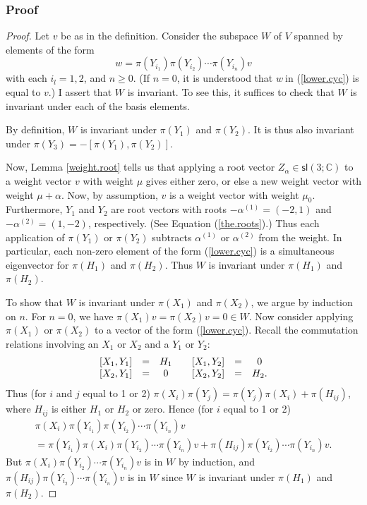 \documentclass{amsbook}
\theoremstyle{plain}
\numberwithin{equation}{chapter}
\numberwithin{theorem}{chapter}
\begin{document}
\subsubsection{Proof}

\begin{proof}
Let $v$ be as in the definition. Consider the subspace $W$ of $V$ spanned by
elements of the form
\begin{equation}
w=\pi(Y_{i_{1}})\pi(Y_{i_{2}})\cdots\pi(Y_{i_{n}})v\label{lower.cyc}%
\end{equation}
with each $i_{l}=1,2$, and $n\geq0$. (If $n=0$, it is understood that $w\ $in
(\ref{lower.cyc}) is equal to $v$.) I assert that $W$ is invariant. To see
this, it suffices to check that $W$ is invariant under each of the basis elements.

By definition, $W$ is invariant under $\pi(Y_{1})$ and $\pi(Y_{2})$. It is
thus also invariant under $\pi(Y_{3})=-\left[  \pi(Y_{1}),\pi(Y_{2})\right]  $.

Now, Lemma \ref{weight.root} tells us that applying a root vector $Z_{\alpha
}\in\mathsf{sl}\left(  3;\mathbb{C}\right)  $ to a weight vector $v$ with
weight $\mu$ gives either zero, or else a new weight vector with weight
$\mu+\alpha$. Now, by assumption, $v$ is a weight vector with weight $\mu_{0}%
$. Furthermore, $Y_{1}$ and $Y_{2}$ are root vectors with roots $-\alpha
^{(1)}=(-2,1)$ and $-\alpha^{(2)}=(1,-2)$, respectively. (See Equation
(\ref{the.roots}).) Thus each application of $\pi(Y_{1})$ or $\pi(Y_{2})$
subtracts $\alpha^{(1)}$ or $\alpha^{(2)}$ from the weight. In particular,
each non-zero element of the form (\ref{lower.cyc}) is a simultaneous
eigenvector for $\pi(H_{1})$ and $\pi(H_{2})$. Thus $W$ is invariant under
$\pi(H_{1})$ and $\pi(H_{2})$.

To show that $W$ is invariant under $\pi(X_{1})$ and $\pi(X_{2})$, we argue by
induction on $n$. For $n=0$, we have $\pi(X_{1})v=\pi(X_{2})v=0\in W$. Now
consider applying $\pi(X_{1})$ or $\pi(X_{2})$ to a vector of the form
(\ref{lower.cyc}). Recall the commutation relations involving an $X_{1}$ or
$X_{2}$ and a $Y_{1}$ or $Y_{2}$:
\[%
\begin{array}
[c]{ccccccc}%
\left[  X_{1},Y_{1}\right]   & = & H_{1} &  & \left[  X_{1},Y_{2}\right]   &
= & 0\\
\left[  X_{2},Y_{1}\right]   & = & 0 &  & \left[  X_{2},Y_{2}\right]   & = &
H_{2}\text{.}%
\end{array}
\]
Thus (for $i$ and $j$ equal to 1 or 2) $\pi(X_{i})\pi(Y_{j})=\pi(Y_{j}%
)\pi(X_{i})+\pi(H_{ij})$, where $H_{ij}$ is either $H_{1}$ or $H_{2}$ or zero.
Hence (for $i$ equal to 1 or 2)
\begin{align*}
\pi(X_{i})\pi(Y_{i_{1}})\pi(Y_{i_{2}})\cdots\pi(Y_{i_{n}})v\\
=\pi(Y_{i_{1}})\pi(X_{i})\pi(Y_{i_{2}})\cdots\pi(Y_{i_{n}})v+\pi(H_{ij}%
)\pi(Y_{i_{2}})\cdots\pi(Y_{i_{n}})v\text{.}%
\end{align*}
But $\pi(X_{i})\pi(Y_{i_{2}})\cdots\pi(Y_{i_{n}})v$ is in $W$ by induction,
and $\pi(H_{ij})\pi(Y_{i_{2}})\cdots\pi(Y_{i_{n}})v$ is in $W$ since $W$ is
invariant under $\pi(H_{1})$ and $\pi(H_{2})$.


\end{proof}
\end{document}
